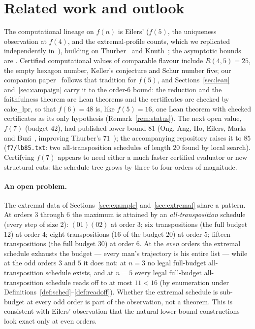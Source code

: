 \documentclass[11pt]{article}
\begin{document}
\section{Related work and outlook}\label{sec:outlook}

The computational lineage on $f(n)$ is Eilers' ($f(5)$, the uniqueness observation at $f(4)$,
and the extremal-profile counts, which we replicated independently in~\cite{f5paper}), building on
Thurber~\cite{thurber} and Knuth~\cite{knuth}; the asymptotic bounds are \cite{kow,pp}. Certified
computational values of comparable flavour include $R(4,5)=25$, the empty hexagon number, Keller's
conjecture and Schur number five; our companion paper~\cite{f5paper} follows that tradition for
$f(5)$, and Sections~\ref{sec:lean} and~\ref{sec:campaign} carry it to the order-6 bound: the
reduction and the faithfulness theorem are Lean theorems and the certificates are checked by
cake\_lpr, so that $f(6)=48$ is, like $f(5)=16$, one Lean theorem with checked certificates as
its only hypothesis (Remark~\ref{rem:status}). The next open
value, $f(7)$ (budget $42$), had published lower bound $81$ (Ong, Ang, Ho, Eilers, Marks and
Buzi~\cite{ong24}, improving Thurber's $71$~\cite{thurber}); the accompanying repository raises it
to $85$ (\texttt{f7/lb85.txt}: two all-transposition schedules of length $20$ found by local
search). Certifying $f(7)$ appears to need either a much faster certified evaluator or new
structural cuts: the schedule tree grows by three to four orders of magnitude.

\paragraph{An open problem.} The extremal data of
Sections~\ref{sec:example} and~\ref{sec:extremal} share a pattern. At orders $3$
through $6$ the maximum is attained by an \emph{all-transposition} schedule (every
step of size $2$): $(01)(02)$ at order $3$; six transpositions (the full budget
$12$) at order $4$; eight transpositions ($16$ of the budget $20$) at order $5$;
fifteen transpositions (the full budget $30$) at order $6$. At the \emph{even}
orders the extremal schedule exhausts the budget --- every man's trajectory is his
entire list --- while at the odd orders $3$ and $5$ it does not: at $n=3$ no legal full-budget
all-transposition schedule exists, and at $n=5$ every legal full-budget all-transposition
schedule reads off to at most $11<16$ (by enumeration under
Definitions~\ref{def:sched}--\ref{def:readoff}). Whether the extremal schedule is sub-budget at
every odd order is part of the observation, not a theorem. This is consistent with Eilers'
observation that the natural lower-bound constructions look exact only at even orders.
\end{document}
